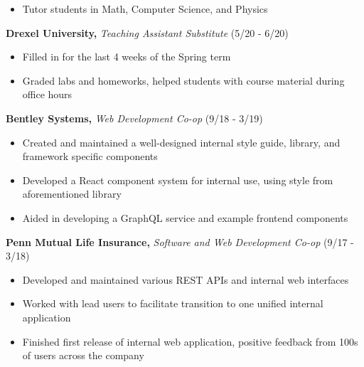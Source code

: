 \documentclass[10pt]{article}
\begin{document}
\vspace{-\topsep}
\begin{itemize}
    \setlength\itemsep{-0.5em}
    \item Tutor students in Math, Computer Science, and Physics
\end{itemize}

\vspace{-0.5em}
\textbf{Drexel University,}
\emph{Teaching Assistant Substitute}
(5/20 - 6/20)

\vspace{-\topsep}
\begin{itemize}
    \setlength\itemsep{-0.5em}
    \item Filled in for the last 4 weeks of the Spring term
    \item Graded labs and homeworks, helped students with course
        material during office hours
\end{itemize}

\vspace{-0.5em}
\textbf{Bentley Systems,}
\emph{Web Development Co-op}
(9/18 - 3/19)

\vspace{-\topsep}
\begin{itemize}
    \setlength\itemsep{-0.5em}
    \item Created and maintained a well-designed internal style
        guide, library, and framework specific components
    \item Developed a React component system for internal use, using style
        from aforementioned library
    \item Aided in developing a GraphQL service and example frontend
        components
\end{itemize}

\vspace{-0.5em}
\textbf{Penn Mutual Life Insurance,}
\emph{Software and Web Development Co-op}
(9/17 - 3/18)

\vspace{-\topsep}
\begin{itemize}
    \setlength\itemsep{-0.5em}
    \item Developed and maintained various REST APIs and
        internal web interfaces
    \item Worked with lead users to facilitate transition to one unified
        internal application
    \item Finished first release of internal web application,
        positive feedback from 100s of users across the company
\end{itemize}
\end{document}
